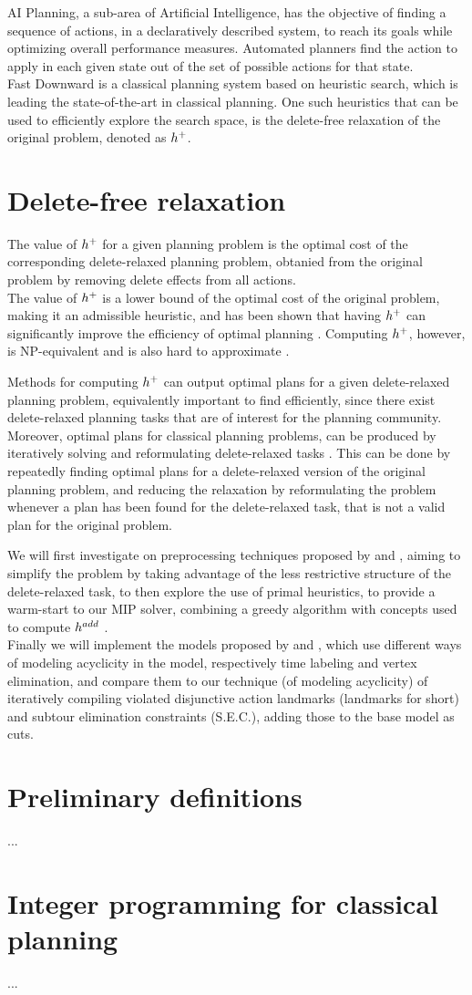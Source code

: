 AI Planning, a sub-area of Artificial Intelligence, has the objective of finding a sequence of actions, in a declaratively described system, to reach its goals while optimizing overall performance measures. Automated planners find the action to apply in each given state out of the set of possible actions for that state.\\
Fast Downward \cite{Helmert_06} is a classical planning system based on heuristic search, which is leading the state-of-the-art in classical planning. One such heuristics that can be used to efficiently explore the search space, is the delete-free relaxation of the original problem, denoted as $h^+$.

\section{Delete-free relaxation}
The value of $h^+$ for a given planning problem is the optimal cost of the corresponding delete-relaxed planning problem, obtanied from the original problem by removing delete effects from all actions.\\
The value of $h^+$ is a lower bound of the optimal cost of the original problem, making it an admissible heuristic, and has been shown that having $h^+$ can significantly improve the efficiency of optimal planning \cite{Helmert_09}. Computing $h^+$, however, is NP-equivalent \cite{Bylander_94} and is also hard to approximate \cite{Helmert_09}.

Methods for computing $h^+$ can output optimal plans for a given delete-relaxed planning problem, equivalently important to find efficiently, since there exist delete-relaxed planning tasks that are of interest for the planning community. Moreover, optimal plans for classical planning problems, can be produced by iteratively solving and reformulating delete-relaxed tasks \cite{LB_Haslum_12}. This can be done by repeatedly finding optimal plans for a delete-relaxed version of the original planning problem, and reducing the relaxation by reformulating the problem whenever a plan has been found for the delete-relaxed task, that is not a valid plan for the original problem.

We will first investigate on preprocessing techniques proposed by \cite{Imai_15} and \cite{MLM_Haslum_12}, aiming to simplify the problem by taking advantage of the less restrictive structure of the delete-relaxed task, to then explore the use of primal heuristics, to provide a warm-start to our MIP solver, combining a greedy algorithm with concepts used to compute $h^{add}$ \cite{Bonet_01}.\\
Finally we will implement the models proposed by \cite{Imai_15} and \cite{Rankooh_22}, which use different ways of modeling acyclicity in the model, respectively time labeling and vertex elimination, and compare them to our technique (of modeling acyclicity) of iteratively compiling violated disjunctive action landmarks (landmarks for short) and subtour elimination constraints (S.E.C.), adding those to the base model as cuts.

\section{Preliminary definitions}
...

\section{Integer programming for classical planning}
...